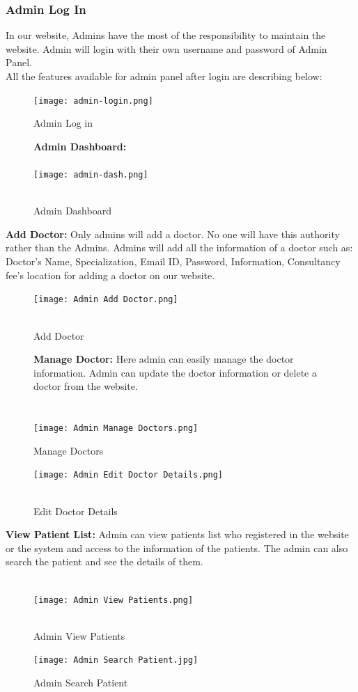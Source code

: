 \documentclass[14pt,a4paper,calibribody]{article}
\begin{document}
\subsubsection{Admin Log In}
In our website, Admins have the most of the responsibility to maintain the website. Admin will login with their own username and password of Admin Panel.\\
All the features available for admin panel after login are describing below:\\
\begin{figure}[h]
\texttt{[image: admin-login.png]}\\
\caption{Admin Log in}
\end{figure}

\begin{figure}[h]
\textbf{Admin Dashboard:}\\\\
\texttt{[image: admin-dash.png]}\\\\
\caption{Admin Dashboard}
\end{figure}
\textbf{Add Doctor:} Only admins will add a doctor. No one will have this authority rather than the Admins. Admins will add all the information of a doctor such as: Doctor’s Name, Specialization, Email ID, Password, Information, Consultancy fee’s location for adding a doctor on our website.\\
\begin{figure}[h]
\texttt{[image: Admin Add Doctor.png]}\\\\
\caption{Add Doctor}
\end{figure}
\begin{figure}[h]
\textbf{Manage Doctor:} Here admin can easily manage the doctor information. Admin can update the doctor information or delete a doctor from the website.\\\\\\
\texttt{[image: Admin Manage Doctors.png]}\\
\caption{Manage Doctors}
\end{figure}
\begin{figure}[h]
\texttt{[image: Admin Edit Doctor Details.png]}\\\\
\caption{Edit Doctor Details}
\end{figure}
\clearpage
\textbf{View Patient List:} Admin can view patients list who registered in the website or the system and access to the information of the patients. The admin can also search the patient and see the details of them.\\\\
\begin{figure}[h]
\texttt{[image: Admin View Patients.png]}\\\\
\caption{Admin View Patients}
\end{figure}
\begin{figure}[h]
\texttt{[image: Admin Search Patient.jpg]}\\
\caption{Admin Search Patient}
\end{figure}
\clearpage
\end{document}
